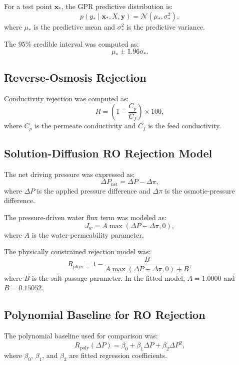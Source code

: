 For a test point $\mathbf{x}_*$, the GPR predictive distribution is:
\begin{equation}
p(y_* \mid \mathbf{x}_*, X, \mathbf{y}) =
\mathcal{N}(\mu_*, \sigma_*^2),
\end{equation}
where $\mu_*$ is the predictive mean and $\sigma_*^2$ is the predictive variance.

The 95\% credible interval was computed as:
\begin{equation}
\mu_* \pm 1.96\sigma_*.
\end{equation}

\subsection{Reverse-Osmosis Rejection}
Conductivity rejection was computed as:
\begin{equation}
R = \left(1-\frac{C_p}{C_f}\right)\times 100,
\end{equation}
where $C_p$ is the permeate conductivity and $C_f$ is the feed conductivity.

\subsection{Solution-Diffusion RO Rejection Model}
The net driving pressure was expressed as:
\begin{equation}
\Delta P_{\mathrm{net}} = \Delta P - \Delta \pi,
\end{equation}
where $\Delta P$ is the applied pressure difference and $\Delta \pi$ is the osmotic-pressure difference.

The pressure-driven water flux term was modeled as:
\begin{equation}
J_w = A\max(\Delta P-\Delta \pi,0),
\end{equation}
where $A$ is the water-permeability parameter.

The physically constrained rejection model was:
\begin{equation}
R_{\mathrm{phys}} =
1-\frac{B}{A\max(\Delta P-\Delta \pi,0)+B},
\end{equation}
where $B$ is the salt-passage parameter. In the fitted model, $A=1.0000$ and $B=0.15052$.

\subsection{Polynomial Baseline for RO Rejection}
The polynomial baseline used for comparison was:
\begin{equation}
R_{\mathrm{poly}}(\Delta P) =
\beta_0+\beta_1\Delta P+\beta_2\Delta P^2,
\end{equation}
where $\beta_0$, $\beta_1$, and $\beta_2$ are fitted regression coefficients.

